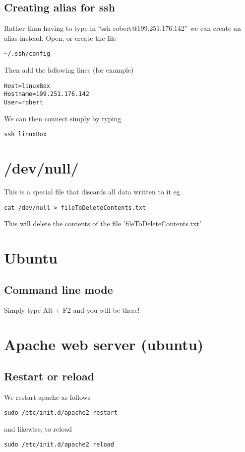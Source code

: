 \documentclass[a4paper, 10pt]{article}
\begin{document}
\subsection*{Creating alias for ssh}

Rather than having to type in ``ssh robert@199.251.176.142'' we can create an alias instead. Open, or create the file 
\begin{verbatim}
~/.ssh/config
\end{verbatim}
Then add the following lines (for example)
\begin{verbatim}
Host=linuxBox
Hostname=199.251.176.142
User=robert
\end{verbatim}
We can then connect simply by typing
\begin{verbatim}
ssh linuxBox
\end{verbatim}

\section*{/dev/null/}

This is a special file that discards all data written to it eg.
\begin{verbatim}
cat /dev/null > fileToDeleteContents.txt
\end{verbatim}
This will delete the contents of the file 'fileToDeleteContents.txt'

\section*{Ubuntu}

\subsection*{Command line mode}

Simply type Alt + F2 and you will be there!

\section*{Apache web server (ubuntu)}
\label{sec:apache-web-server}

\subsection*{Restart or reload}
\label{sec:restart-or-reload}

We restart apache as follows
\begin{verbatim}
sudo /etc/init.d/apache2 restart
\end{verbatim}
and likewise, to reload
\begin{verbatim}
sudo /etc/init.d/apache2 reload
\end{verbatim}
\end{document}
